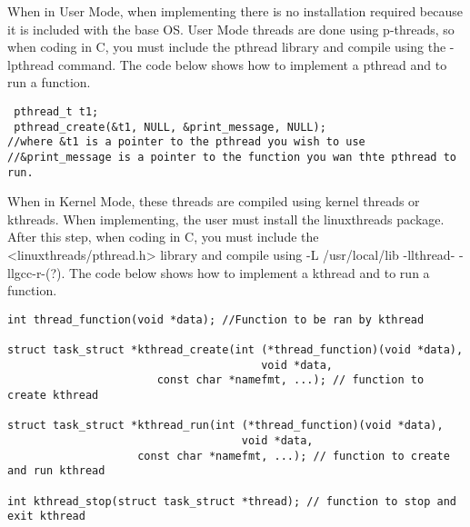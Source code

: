\documentclass[letterpaper,10pt,titlepage,draftclsnofoot,onecolumn]{IEEEtran}
\begin{document}
When in User Mode, when implementing there is no installation required because it is included with the base OS. User Mode threads are done using p-threads, so when coding in C, you must include the pthread library and compile using the -lpthread command.\cite{FreeBSD2} The code below shows how to implement a pthread and to run a function. \cite{pthread}

\begin{lstlisting}
 pthread_t t1;
 pthread_create(&t1, NULL, &print_message, NULL);
//where &t1 is a pointer to the pthread you wish to use 
//&print_message is a pointer to the function you wan thte pthread to run. 
\end{lstlisting} \cite{pthread}


When in Kernel Mode, these threads are compiled using kernel threads or kthreads. When implementing, the user must install the linuxthreads package. After this step, when coding in C, you  must include the <linuxthreads/pthread.h> library and compile using -L /usr/local/lib -llthread- -llgcc-r-(?). \cite{FreeBSD2} The code below shows how to implement a kthread and to run a function. \cite{kernel_thread}

\begin{lstlisting}
int thread_function(void *data); //Function to be ran by kthread

struct task_struct *kthread_create(int (*thread_function)(void *data),
                                       void *data,
				       const char *namefmt, ...); // function to create kthread
					   
struct task_struct *kthread_run(int (*thread_function)(void *data),
                                    void *data,
				    const char *namefmt, ...); // function to create and run kthread
					
int kthread_stop(struct task_struct *thread); // function to stop and exit kthread
\end{lstlisting}
\end{document}
